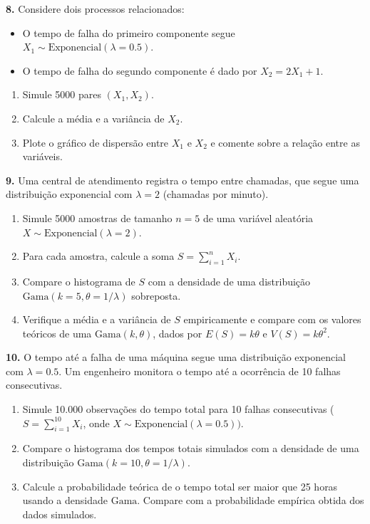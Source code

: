 \documentclass[
]{book}
\begin{document}
\textbf{8.} Considere dois processos relacionados:

\begin{itemize}
\item
  O tempo de falha do primeiro componente segue \(X_1 \sim \text{Exponencial}(\lambda = 0.5)\).
\item
  O tempo de falha do segundo componente é dado por \(X_2 = 2X_1 + 1\).
\end{itemize}

\begin{enumerate}
\def\labelenumi{(\alph{enumi})}
\item
  Simule 5000 pares \((X_1, X_2)\).
\item
  Calcule a média e a variância de \(X_2\).
\item
  Plote o gráfico de dispersão entre \(X_1\) e \(X_2\) e comente sobre a relação entre as variáveis.
\end{enumerate}

\textbf{9.} Uma central de atendimento registra o tempo entre chamadas, que segue uma distribuição exponencial com \(\lambda = 2\) (chamadas por minuto).

\begin{enumerate}
\def\labelenumi{(\alph{enumi})}
\item
  Simule 5000 amostras de tamanho \(n = 5\) de uma variável aleatória \(X \sim \text{Exponencial}(\lambda = 2)\).
\item
  Para cada amostra, calcule a soma \(S = \sum_{i=1}^n X_i\).
\item
  Compare o histograma de \(S\) com a densidade de uma distribuição \(\text{Gama}(k = 5, \theta = 1/\lambda)\) sobreposta.
\item
  Verifique a média e a variância de \(S\) empiricamente e compare com os valores teóricos de uma \(\text{Gama}(k, \theta)\), dados por \(E(S) = k\theta\) e \(V(S) = k\theta^2\).
\end{enumerate}

\textbf{10.} O tempo até a falha de uma máquina segue uma distribuição exponencial com \(\lambda = 0.5\). Um engenheiro monitora o tempo até a ocorrência de 10 falhas consecutivas.

\begin{enumerate}
\def\labelenumi{(\alph{enumi})}
\item
  Simule 10.000 observações do tempo total para 10 falhas consecutivas (\(S = \sum_{i=1}^{10} X_i\), onde \(X \sim \text{Exponencial}(\lambda = 0.5))\).
\item
  Compare o histograma dos tempos totais simulados com a densidade de uma distribuição \(\text{Gama}(k = 10, \theta = 1/\lambda)\).
\item
  Calcule a probabilidade teórica de o tempo total ser maior que 25 horas usando a densidade \(\text{Gama}\). Compare com a probabilidade empírica obtida dos dados simulados.
\end{enumerate}
\end{document}
